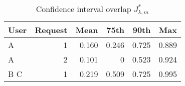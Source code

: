 
\begin{table}[ht]
\caption{Confidence interval overlap $J_{k,m}^{*}$\label{tab:coverage}}
\centering
	\begin{tabular}{lrrrrr}
User&Request&  Mean&  75th & 90th & Max  \\
		   \hline
A    &1     & 0.160&  0.246 & 0.725& 0.889      \\%
A    &2     & 0.101&  0     & 0.523& 0.924      \\%
B%
C    &1     & 0.219&  0.509 & 0.725& 0.995      \\%
	\end{tabular}
	
\end{table}
	